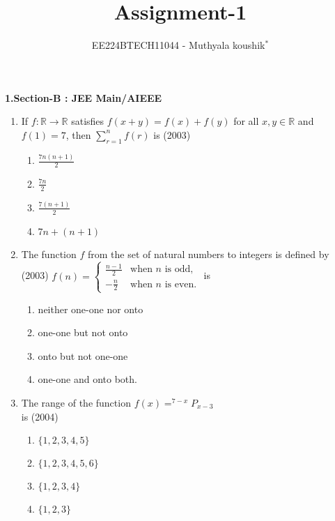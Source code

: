 \documentclass[journal,12pt,twocolumn]{IEEEtran}
\theoremstyle{remark}
\begin{document}

\vspace{3cm}

\title{Assignment-1}
\author{EE224BTECH11044 - Muthyala koushik$^{*}$%
}
\maketitle
\newpage
\bigskip

\renewcommand{\thefigure}{\theenumi}
\renewcommand{\thetable}{\theenumi}

\textbf{1.Section-B : JEE Main/AIEEE}
\begin{enumerate}[start=4]
     \item If $f: \mathbb{R} \to \mathbb{R}$ satisfies $f(x+y) = f(x) + f(y)$ for all $x, y \in \mathbb{R}$ and $f(1) = 7$, then $\sum_{r=1}^n f(r)$ is \hfill(2003)
		
    \begin{enumerate}
        \item $\frac{7n(n+1)}{2}$\\
        \item $\frac{7n}{2}$\\
        \item $\frac{7(n+1)}{2}$\\
        \item $7n + (n+1)$
    \end{enumerate}

    \item The function $f$ from the set of natural numbers to integers is defined by \hfill(2003)
               $f(n) = \begin{cases} \frac{n-1}{2} & \text{when } n \text{ is odd}, \\-\frac{n}{2} & \text{when } n \text{ is even}.\end{cases}$ is

	\begin{enumerate}
		\item neither one-one nor onto
		\item one-one but not onto
		\item onto but not one-one
		\item one-one and onto both.
	\end{enumerate} 

\item The range of the function $f(x)=^{7-x}P_{x-3}$ \\ is \hfill(2004)
	\begin{enumerate}
		\item $\{1,2,3,4,5\}$
		\item $\{1,2,3,4,5,6\}$
		\item $\{1,2,3,4\}$
		\item $\{1,2,3\}$
	\end{enumerate}


\end{enumerate}
\end{document}

